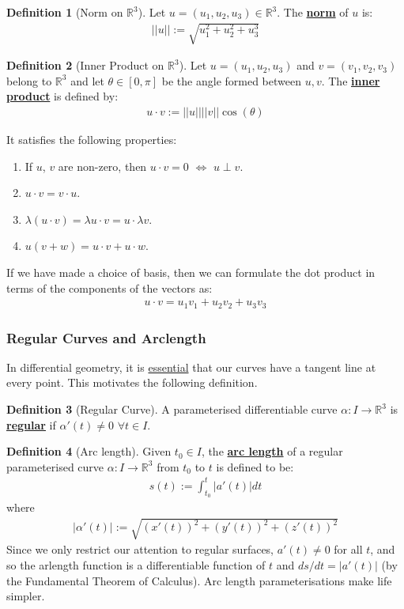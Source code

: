 \documentclass[11pt]{scrartcl}
\newcommand{\R}[0]{\mathbb{R}}
\theoremstyle{definition}
\newtheorem{definition}{Definition}
\theoremstyle{remark}
\newcommand{\dfn}[1]{\textbf{\underline{#1}}}
\newcommand{\idx}[2]{\int_{#1}^{#2}}
\begin{document}
{\begin{definition}[Norm on $\R^3$]
	Let $u = (u_1, u_2, u_3) \in \R^3$. The \dfn{norm} of $u$ is: 
	\begin{align*}
		|| u || := \sqrt{ u_1^2 + u_2^2 + u_3^3} 
	\end{align*}
\end{definition}

\begin{definition}[Inner Product on $\R^3$] 
	Let $u = (u_1, u_2, u_3)$ and $v= (v_1, v_2, v_3)$ belong to $\R^3$ and let $\theta \in [0, \pi]$ be the angle formed between $u,v$. The \dfn{inner product} is defined by: 
	\begin{align}
		u \cdot v := || u || ||v|| \cos (\theta) 	
	\end{align}
\end{definition}
It satisfies the following properties: 
\begin{enumerate}[noitemsep]
	\item If $u$, $v$ are non-zero, then $u \cdot v = 0$ $\iff$ $u \perp v$. 
	\item $u \cdot v = v \cdot u$. 
	\item $\lambda (u \cdot v ) = \lambda u \cdot v =  u \cdot \lambda v$. 
	\item $u ( v + w) = u \cdot v + u \cdot w$. 
\end{enumerate}
If we have made a choice of basis, then we can formulate the dot product in terms of the components of the vectors as: 
\begin{align}
	u \cdot v = u_1 v_1 + u_2 v_2 + u_3 v_3 	
\end{align}

\subsubsection{Regular Curves and Arclength}
In differential geometry, it is \underline{essential} that our curves have a tangent line at every point. This motivates the following definition. 

\begin{definition}[Regular Curve]
	A parameterised differentiable curve $\alpha: I \rightarrow \R^3$ is \dfn{regular} if $\alpha' (t) \neq 0$ $\forall t \in I$. 
\end{definition}

\begin{definition}[Arc length]
	Given $t_0 \in I$, the \dfn{arc length} of a regular parameterised curve $\alpha: I \rightarrow \R^3$ from $t_0$ to $t$ is defined to be: 
	\begin{align*}
		s(t) := \idx{t_0}{t} | a'(t) | dt 
	\end{align*}
	where
	\begin{align*}
		| \alpha' (t) | := \sqrt{(x'(t))^2 + (y'(t))^2 + (z'(t))^2}
	\end{align*}
	Since we only restrict our attention to regular surfaces, $a'(t) \neq 0$ for all $t$, and so the arlength function is a differentiable function of $t$ and $ds/dt = |a'(t)|$ (by the Fundamental Theorem of Calculus). Arc length parameterisations make life simpler. 
\end{definition}

}
\end{document}
